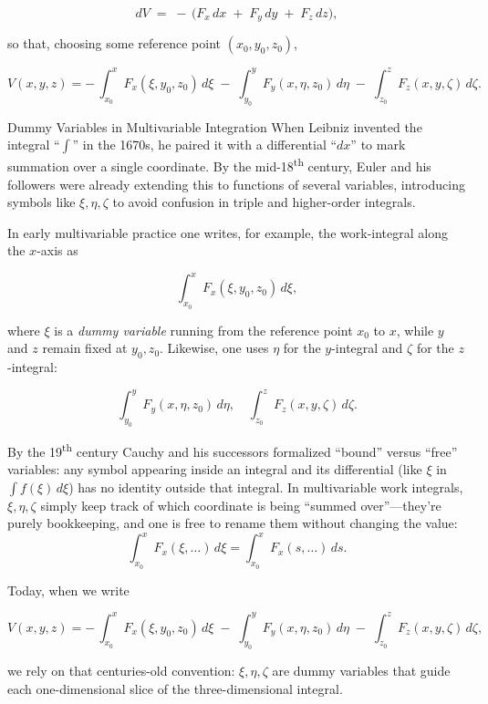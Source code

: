 \[
dV
\;=\;
-\,\bigl(F_x\,dx \;+\;F_y\,dy \;+\;F_z\,dz\bigr),
\]

so that, choosing some reference point \((x_0,y_0,z_0)\),

\[
V(x,y,z)
=
-\,\int_{x_0}^{x}F_x(\xi,y_0,z_0)\,d\xi
\;-\;
\int_{y_0}^{y}F_y(x,\eta,z_0)\,d\eta
\;-\;
\int_{z_0}^{z}F_z(x,y,\zeta)\,d\zeta.
\]

\medskip

\begin{HistoricalSidebar}{Dummy Variables in Multivariable Integration}
    When Leibniz invented the integral “\(\displaystyle\int\)” in the 1670s, he paired it with a differential “\(dx\)” to mark summation over a single coordinate.  By the mid-18\textsuperscript{th} century, Euler and his followers were already extending this to functions of several variables, introducing symbols like \(\xi,\eta,\zeta\) to avoid confusion in triple and higher-order integrals.
    
    \medskip
    
    In early multivariable practice one writes, for example, the work-integral along the \(x\)-axis as

    \[
    \int_{x_0}^{x} F_x(\xi,y_0,z_0)\,d\xi,
    \]

    where \(\xi\) is a \emph{dummy variable} running from the reference point \(x_0\) to \(x\), while \(y\) and \(z\) remain fixed at \(y_0,z_0\).  Likewise, one uses \(\eta\) for the \(y\)-integral and \(\zeta\) for the \(z\)-integral:

    \[
    \int_{y_0}^{y} F_y(x,\eta,z_0)\,d\eta,
    \quad
    \int_{z_0}^{z} F_z(x,y,\zeta)\,d\zeta.
    \]
    
    \medskip
    
    By the 19\textsuperscript{th} century Cauchy and his successors formalized “bound” versus “free” variables: any symbol appearing inside an integral and its differential (like \(\xi\) in \(\int f(\xi)\,d\xi\)) has no identity outside that integral.  In multivariable work integrals, \(\xi,\eta,\zeta\) simply keep track of which coordinate is being “summed over”—they’re purely bookkeeping, and one is free to rename them without changing the value:
    \[
    \int_{x_0}^{x}F_x(\xi,\dots)\,d\xi
    =
    \int_{x_0}^{x}F_x(s,\dots)\,ds.
    \]
    
    \medskip
    
    Today, when we write

    \[
    V(x,y,z)
    =
    -\,\int_{x_0}^{x}F_x(\xi,y_0,z_0)\,d\xi
    \;-\;
    \int_{y_0}^{y}F_y(x,\eta,z_0)\,d\eta
    \;-\;
    \int_{z_0}^{z}F_z(x,y,\zeta)\,d\zeta,
    \]

    we rely on that centuries-old convention: \(\xi,\eta,\zeta\) are dummy variables that guide each one-dimensional slice of the three-dimensional integral.
    \end{HistoricalSidebar}
    


